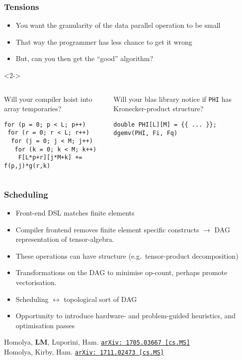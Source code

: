\documentclass[presentation]{beamer}
\newcommand{\arxivlink}[2]{%
  \href{http://www.arxiv.org/abs/#1}%
  {\texttt{arXiv:\,#1\,[#2]}}%
}
\begin{document}
\begin{frame}[fragile]
  \frametitle{Tensions}
  \begin{itemize}
  \item You want the granularity of the data parallel operation to be
    small
  \item That way the programmer has less chance to get it wrong
  \item But, can you then get the ``good'' algorithm?
  \end{itemize}
  \hspace{0.5\baselineskip}
  \begin{uncoverenv}<2->
    \begin{columns}
      \begin{column}{0.5\textwidth}
        Will your compiler hoist into array temporaries?
\begin{verbatim}
for (p = 0; p < L; p++)
 for (r = 0; r < L; r++)
  for (j = 0; j < M; j++)
   for (k = 0; k < M; k++)
    F[L*p+r][j*M+k] += f(p,j)*g(r,k)
\end{verbatim}
    \end{column}
    \begin{column}{0.5\textwidth}
      Will your blas library notice if \texttt{PHI} has
      Kronecker-product structure?
\begin{verbatim}
double PHI[L][M] = {{ ... }};
dgemv(PHI, Fi, Fq)
\end{verbatim}
    \end{column}
  \end{columns}
\end{uncoverenv}
\end{frame}
\begin{frame}
  \frametitle{Scheduling}
  \begin{itemize}
  \item Front-end DSL matches finite elements
  \item Compiler frontend removes finite element specific constructs $\rightarrow$
    DAG representation of tensor-algebra.
  \item These operations can have structure (e.g.~tensor-product
    decomposition)
  \item Transformations on the DAG to minimise op-count, perhaps
    promote vectorisation.
  \item Scheduling $\leftrightarrow$ topological sort of DAG
  \item Opportunity to introduce hardware- and problem-guided
    heuristics, and optimisation passes
  \end{itemize}
  \begin{flushright}
    {\scriptsize Homolya, \textbf{LM}, Luporini,
      Ham. \arxivlink{1705.03667}{cs.MS}\nocite{Homolya:2017} \\

      Homolya, Kirby, Ham.  \arxivlink{1711.02473}{cs.MS}\nocite{Homolya:2017a}}
  \end{flushright}
\end{frame}
\end{document}

